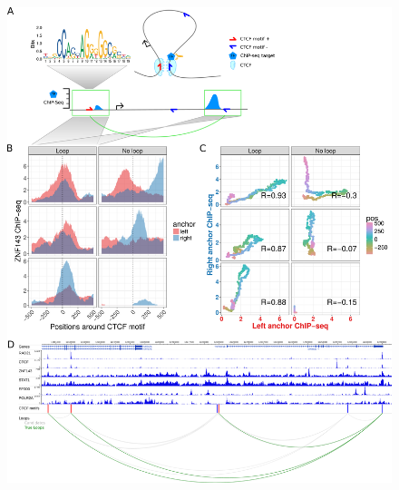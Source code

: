 \documentclass[a4paper,twoside=true,openright,parskip=full,chapterprefix=true,11pt,headings=normal,bibliography=totoc,listof=totoc,titlepage=on,captions=tableabove,draft=false]{scrreprt}
\theoremstyle{definition}
\theoremstyle{definition}
\theoremstyle{definition}
\theoremstyle{remark}
\begin{document}
\begin{figure}

{\centering \includegraphics[width=0.9\linewidth]{figures/loop_prediction/fig1_v06} 

}


\end{figure}
\end{document}

